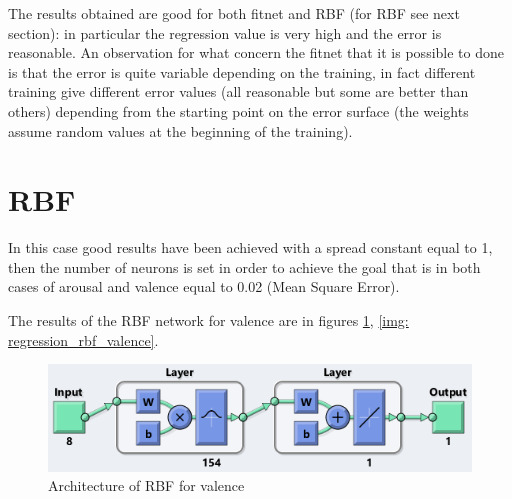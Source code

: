 \documentclass[a4paper]{report}
\begin{document}
\newpage
\noindent The results obtained are good for both fitnet and RBF (for RBF see next section): in particular the regression value is very high and the error is reasonable. An observation for what concern the fitnet that it is possible to done is that the error is quite variable depending on the training, in fact different training give different error values (all reasonable but some are better than others) depending from the starting point on the error surface (the weights assume random values at the beginning of the training).

	\section{RBF}
	\noindent In this case good results have been achieved with a spread constant equal to 1, then the number of neurons is set in order to achieve the goal that is in both cases of arousal and valence equal to 0.02 (Mean Square Error).
	
	\noindent The results of the RBF network for valence are in figures \ref{img: rbf_valence}, \ref{img: regression_rbf_valence}.
	
	\begin{figure}[htbp]
		\centering
		\includegraphics[scale=0.8]{img/rbf_valence.png}
		\caption{Architecture of RBF for valence}
		\label{img: rbf_valence}
	\end{figure}
	
\end{document}
